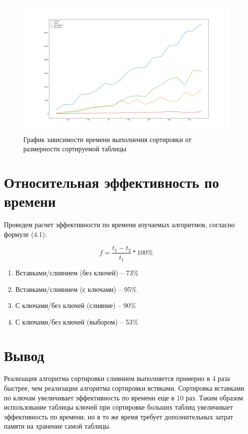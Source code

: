 \begin{figure}
	\includegraphics[width=\linewidth]{img/sort_time.png}
	\caption{График зависимости времени выполнения сортировки от размерности сортируемой таблицы}
\end{figure}

\section{Относительная эффективность по времени}

Проведем расчет эффективности по времени изучаемых алгоритмов, согласно формуле (4.1):

\begin{equation}
	f = \frac{t_1 - t_2}{t_1} * 100\%
\end{equation}

\begin{enumerate}
	\item Вставками/слиянием (без ключей) -- 73\%
	\item Вставками/слиянием (с ключами) -- 95\%
	\item С ключами/без ключей (слияние) -- 90\%
	\item С ключами/без ключей (выбором) -- 53\%
\end{enumerate}

\section{Вывод}

Реализация алгоритма сортировки слиянием выполняется примерно в 4 раза быстрее, чем реализации алгоритма сортировки вствками. Сортировка вставками по ключам увеличивает эффективность по времени еще в 10 раз. Таким образом использование таблицы ключей при сортировке больших таблиц увеличивает эффективность по времени, но в то же время требует дополнительных затрат памяти на хранение самой таблицы.

